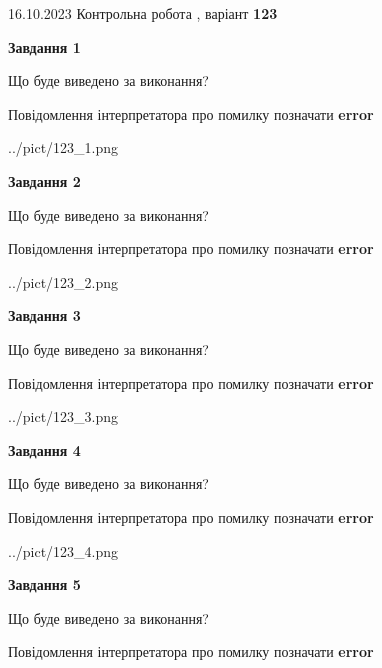 \documentclass[12pt, ukrainian]{article}
\begin{document}
{\Large{16.10.2023 Контрольна робота , варіант  \No \textbf { 123 }\par}}
{
\begin {large}
{\begin {center}\textbf{Завдання 1}\end {center}}\par
Що буде виведено за виконання? \par
Повідомлення інтерпретатора про помилку позначати \textbf{error}

\begin{center}
	{../pict/123_1.png}
\end{center}
\newpage

{\begin {center}\textbf{Завдання 2}\end {center}}\par
Що буде виведено за виконання? \par
Повідомлення інтерпретатора про помилку позначати \textbf{error}

\begin{center}
	{../pict/123_2.png}
\end{center}
\newpage

{\begin {center}\textbf{Завдання 3}\end {center}}\par
Що буде виведено за виконання? \par
Повідомлення інтерпретатора про помилку позначати \textbf{error}

\begin{center}
	{../pict/123_3.png}
\end{center}
\newpage

{\begin {center}\textbf{Завдання 4}\end {center}}\par
Що буде виведено за виконання? \par
Повідомлення інтерпретатора про помилку позначати \textbf{error}

\begin{center}
	{../pict/123_4.png}
\end{center}
\newpage

{\begin {center}\textbf{Завдання 5}\end {center}}\par
Що буде виведено за виконання? \par
Повідомлення інтерпретатора про помилку позначати \textbf{error}


\end{large}}
\end{document}
